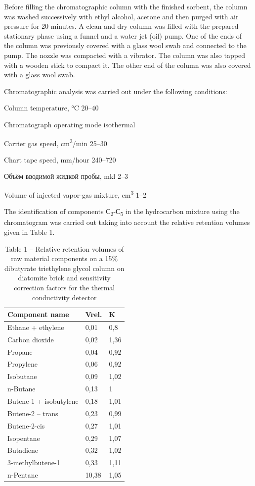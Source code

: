 \begin{multicols}{2}
Before filling the chromatographic column with the finished sorbent, the
column was washed successively with ethyl alcohol, acetone and then
purged with air pressure for 20 minutes. A clean and dry column was
filled with the prepared stationary phase using a funnel and a water jet
(oil) pump. One of the ends of the column was previously covered with a
glass wool swab and connected to the pump. The nozzle was compacted with
a vibrator. The column was also tapped with a wooden stick to compact
it. The other end of the column was also covered with a glass wool swab.

Chromatographic analysis was carried out under the following conditions:

Column temperature, °C 20--40

Chromatograph operating mode isothermal

Carrier gas speed, cm\textsuperscript{3}/min 25--30

Chart tape speed, mm/hour 240--720

Объём вводимой жидкой пробы, mkl 2--3

Volume of injected vapor-gas mixture, cm\textsuperscript{3} 1--2

The identification of components С\textsubscript{2}-С\textsubscript{5}
in the hydrocarbon mixture using the chromatogram was carried out taking
into account the relative retention volumes given in Table 1.

\begin{table}[H]
\caption*{Table 1 -- Relative retention volumes of raw material components on a 15\% dibutyrate triethylene glycol column on diatomite brick and sensitivity correction factors for the thermal conductivity detector}
\centering
\begin{tabular}{|l|l|l|}
\hline
Component name & Vrel. & K \\ \hline
Ethane + ethylene & 0,01 & 0,8 \\ \hline
Carbon dioxide & 0,02 & 1,36 \\ \hline
Propane & 0,04 & 0,92 \\ \hline
Propylene & 0,06 & 0,92 \\ \hline
Isobutane & 0,09 & 1,02 \\ \hline
n-Butane & 0,13 & 1 \\ \hline
Butene-1 + isobutylene & 0,18 & 1,01 \\ \hline
Butene-2 – trans & 0,23 & 0,99 \\ \hline
Butene-2-cis & 0,27 & 1,01 \\ \hline
Isopentane & 0,29 & 1,07 \\ \hline
Butadiene & 0,32 & 1,02 \\ \hline
3-methylbutene-1 & 0,33 & 1,11 \\ \hline
n-Pentane & 10,38 & 1,05 \\ \hline
\end{tabular}
\end{table}


\end{multicols}
